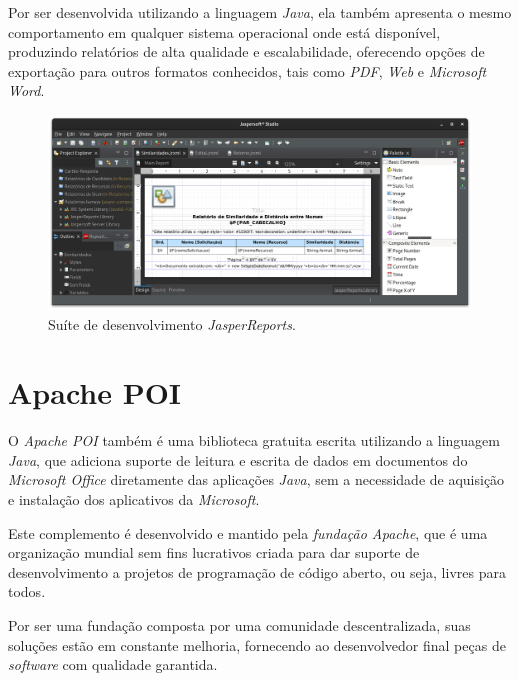 \documentclass[
	12pt,			%
	openright,		%
	oneside,	
	a4paper,		%
	english,		%
	brazil			%
]{abntex2/abntex2}  %
\begin{document}
			Por ser desenvolvida utilizando a linguagem \textit{Java}, ela também apresenta o mesmo comportamento em qualquer sistema operacional onde está disponível, produzindo relatórios de alta qualidade e escalabilidade, oferecendo opções de exportação para outros formatos conhecidos, tais como \textit{PDF}, \textit{Web} e \textit{Microsoft Word}.
			
			\begin{figure}[H]
				\caption{\label{jasper-reports}Suíte de desenvolvimento \textit{JasperReports\textregistered}.}
				\begin{center}
					\includegraphics[scale=0.35]{img/jaspersoft}
				\end{center}
			\end{figure}

		\section{Apache POI}
		
			O \textit{Apache POI} \cite{poi} também é uma biblioteca gratuita escrita utilizando a linguagem \textit{Java}, que adiciona suporte de leitura e escrita de dados em documentos do \textit{Microsoft Office} diretamente das aplicações \textit{Java}, sem a necessidade de aquisição e instalação dos aplicativos da \textit{Microsoft}.
			
			Este complemento é desenvolvido e mantido pela \textit{fundação Apache}, que é uma organização mundial sem fins lucrativos criada para dar suporte de desenvolvimento a projetos de programação de código aberto, ou seja, livres para todos.
			
			Por ser uma fundação composta por uma comunidade descentralizada, suas soluções estão em constante melhoria, fornecendo ao desenvolvedor final peças de \textit{software} com qualidade garantida.
\end{document}
